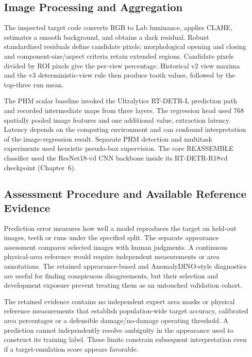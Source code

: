 \subsection{Image Processing and Aggregation}
The inspected target code converts RGB to Lab luminance, applies CLAHE, estimates a
smooth background, and obtains a dark residual. Robust standardized residuals define
candidate pixels; morphological opening and closing and component-size/aspect criteria
retain extended regions. Candidate pixels divided by ROI pixels give the per-view
percentage. Historical v2 view maxima and the v3 deterministic-view rule then produce
tooth values, followed by the top-three run mean.

The PHM scalar baseline invoked the Ultralytics RT-DETR-L prediction path and recorded
intermediate maps from three layers. The regression head used 768 spatially pooled image
features and one additional value, extraction latency. Latency depends on the computing
environment and can confound interpretation of the image-regression result. Separate PHM
detection and multitask experiments used heuristic pseudo-box supervision. The core
REASSEMBLE classifier used the ResNet18-vd CNN backbone inside its RT-DETR-R18vd
checkpoint (Chapter~6).

\subsection{Assessment Procedure and Available Reference Evidence}
Prediction error measures how well a model reproduces the target on held-out images,
teeth or runs under the specified split. The separate appearance assessment compares
selected images with human judgments. A continuous physical-area reference would require
independent measurements or area annotations. The retained appearance-based and
AnomalyDINO-style diagnostics are useful for finding conspicuous disagreements, but
their selection and development exposure prevent treating them as an untouched
validation cohort.

The retained evidence contains no independent expert area masks or physical reference
measurements that establish population-wide target accuracy, calibrated area percentages
or a defensible damage/no-damage operating threshold. A prediction cannot independently
resolve ambiguity in the appearance used to construct its training label. These limits
constrain subsequent interpretation even if a target-emulation score appears
favorable.

